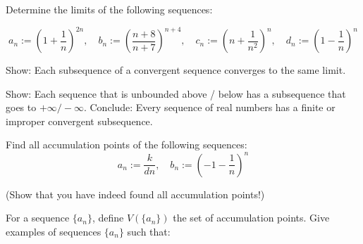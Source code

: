 \documentclass[week=4]{homework}
\date{\today}
\begin{document}
    \maketitle
    \thispagestyle{empty}
    \newpage
    \begin{questions}
		\let\firstquestion\question
		\renewcommand*{\question}{\vspace{7mm}\firstquestion}
        \firstquestion
        Determine the limits of the following sequences:
        
        \[
	        a_n := \left(1 + \frac{1}{n} \right)^{2n}, \quad b_n := \left(\frac{n+8}{n+7} \right)^{n+4}, \quad c_n := \left(n + \frac{1}{n^2} \right)^{n}, \quad d_n := \left(1 - \frac{1}{n} \right)^n
        \]
        
        \question 
        Show: Each subsequence of a convergent sequence converges to the same limit. 
        
        \question 
        Show: Each sequence that is unbounded above / below has a subsequence that goes to $+ \infty / - \infty$. Conclude: Every sequence of real numbers has a finite or improper convergent subsequence. 
        
        \question
        Find all accumulation points of the following sequences:
        \[
	        a_n := \frac{k}{dn}, \quad b_n := \left(-1-\frac{1}{n}\right)^n
        \]
        
        (Show that you have indeed found all accumulation points!)
        
        \question
        For a sequence $\{a_n \} $, define $V(\{a_n \})$ the set of accumulation points. Give examples of sequences $\{a_n \}$ such that:
        
     \end{questions}
\end{document}
